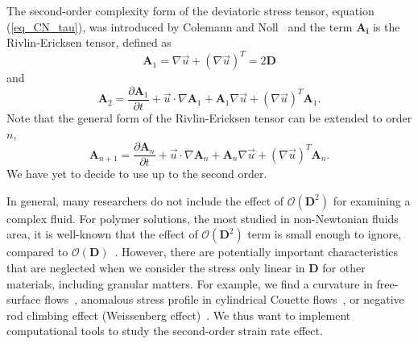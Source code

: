 The second-order complexity form of the deviatoric stress tensor, equation (\ref{eq_CN_tau}), was introduced by Colemann and Noll~\cite{coleman_approximation_1960} and
the term $\bm{A_i}$ is the Rivlin-Ericksen tensor, defined as
\begin{equation}
   {\bm A_1}  = \nabla \vec{u} +  \left( \nabla \vec{u} \right)^T = 2 \bm{D} 
\end{equation}
and 
\begin{equation}
   \boldsymbol{A}_2
   =\frac{\partial \boldsymbol{A}_1}{\partial t} + \vec{u} \cdot \nabla \boldsymbol{A}_1+\boldsymbol{A}_1 \nabla \vec{u}+ \left(\nabla \vec{u} \right)^T \boldsymbol{A}_1.
\end{equation}
Note that the general form of the Rivlin-Ericksen tensor can be extended to order $n$,  
\begin{equation}
  \boldsymbol{A}_{n+1}
  =\frac{\partial \boldsymbol{A}_{n}}{\partial t} + \vec{u} \cdot \nabla \boldsymbol{A}_n+\boldsymbol{A}_n \nabla \vec{u}+ \left(\nabla \vec{u} \right)^T \boldsymbol{A}_n.
\end{equation}
We have yet to decide to use up to the second order.
\par

\par
In general, many researchers do not include the effect of $\mathcal{O}\left( \bm{D}^2 \right)$ for examining a complex fluid. For polymer solutions, the most studied in non-Newtonian fluids area, it is well-known that the effect of  $\mathcal{O}\left( \bm{D}^2 \right)$ term is small enough to ignore, compared to  $\mathcal{O}\left( \bm{D} \right)$~\cite{bird_dynamics_1987}. However, there are potentially important characteristics that are neglected when we consider the stress only linear in $\boldsymbol{D}$ for  other materials, including granular matters. For example, we find a curvature in free-surface flows~\cite{couturier_suspensions_2011}, anomalous stress profile in cylindrical Couette flows~\cite{krishnaraj_dilation-driven_2016}, or negative rod climbing effect (Weissenberg effect)~\cite{boyer_dense_2011}. We thus want to implement computational tools to study the second-order strain rate effect.

